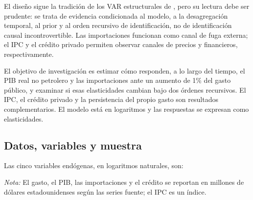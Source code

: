 \documentclass[11pt,a4paper]{article}
\begin{document}
El diseño sigue la tradición de los VAR estructurales de
\textcite{sims1980}, pero su lectura debe ser prudente: se trata de evidencia
condicionada al modelo, a la desagregación temporal, al prior y al orden
recursivo de identificación, no de identificación causal
incontrovertible. Las importaciones funcionan como canal de fuga externa; el IPC
y el crédito privado permiten observar canales de precios y financieros,
respectivamente.

El objetivo de investigación es estimar cómo responden, a lo largo del tiempo,
el PIB real no petrolero y las importaciones ante un aumento de 1\% del gasto
público, y examinar si esas elasticidades cambian bajo dos órdenes recursivos.
El IPC, el crédito privado y la persistencia del propio gasto son resultados
complementarios. El modelo está en logaritmos y las respuestas se expresan como
elasticidades.

\subsection{Datos, variables y muestra}
\label{sec:datos}

Las cinco variables endógenas, en logaritmos naturales, son:

\begin{table}[htbp]
\centering
\small
\caption{Variables del modelo, unidades y fuentes}
\label{tab:variables}
\par\vspace{0.4em}
\begin{minipage}{0.95\textwidth}
\footnotesize\textit{Nota:} El gasto, el PIB, las importaciones y el crédito se reportan en millones de dólares estadounidenses según las series fuente; el IPC es un índice.
\end{minipage}
\end{table}
\end{document}
